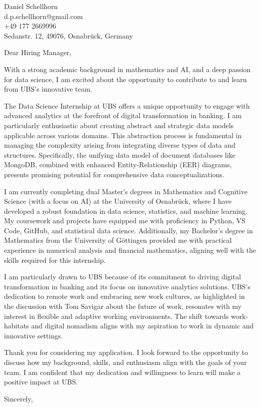 \documentclass[12pt]{letter}
\begin{document}
\begin{letter}{Daniel Schellhorn \\ d.p.schellhorn@gmail.com \\ +49 177 2669996 \\ Sedanstr. 12, 49076, Osnabrück, Germany}

\opening{Dear Hiring Manager,}

With a strong academic background in mathematics and AI, and a deep passion for data science, I am excited about the opportunity to contribute to and learn from UBS’s innovative team.

The Data Science Internship at UBS offers a unique opportunity to engage with advanced analytics at the forefront of digital transformation in banking. I am particularly enthusiastic about creating abstract and strategic data models applicable across various domains. This abstraction process is fundamental in managing the complexity arising from integrating diverse types of data and structures. Specifically, the unifying data model of document databases like MongoDB, combined with enhanced Entity-Relationship (EER) diagrams, presents promising potential for comprehensive data conceptualizations.

I am currently completing dual Master’s degrees in Mathematics and Cognitive Science (with a focus on AI) at the University of Osnabrück, where I have developed a robust foundation in data science, statistics, and machine learning. My coursework and projects have equipped me with proficiency in Python, VS Code, GitHub, and statistical data science. Additionally, my Bachelor's degree in Mathematics from the University of Göttingen provided me with practical experience in numerical analysis and financial mathematics, aligning well with the skills required for this internship.

I am particularly drawn to UBS because of its commitment to driving digital transformation in banking and its focus on innovative analytics solutions. UBS’s dedication to remote work and embracing new work cultures, as highlighted in the discussion with Tom Savigar about the future of work, resonates with my interest in flexible and adaptive working environments. The shift towards work-habitats and digital nomadism aligns with my aspiration to work in dynamic and innovative settings.

Thank you for considering my application. I look forward to the opportunity to discuss how my background, skills, and enthusiasm align with the goals of your team. I am confident that my dedication and willingness to learn will make a positive impact at UBS.

\closing{Sincerely,}

\end{letter}
\end{document}
